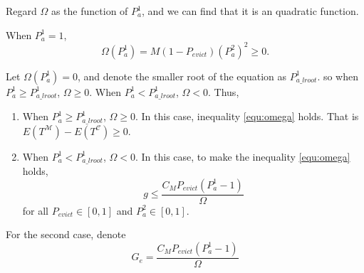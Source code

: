 Regard $\Omega$ as the function of $P_{a}^{\mathfrak{1}}$,
and we can find that it is an quadratic function.

When $P_{a}^{\mathfrak{1}} = 1$,
$$\Omega(P_{a}^{\mathfrak{1}})=M(1-P_{evict})(P_{a}^{\mathfrak{2}})^2 \geq 0 .$$

Let $\Omega(P_{a}^{\mathfrak{1}}) = 0$,
 and denote the smaller root of the equation as $P_{a\_lroot}^{\mathfrak{1}}$.
  so when $P_{a}^{\mathfrak{1}} \geq P_{a\_lroot}^{\mathfrak{1}}$, $\Omega \geq 0$.
   When $P_{a}^{\mathfrak{1}} < P_{a\_lroot}^{\mathfrak{1}}$, $\Omega < 0$.
 Thus,
\begin{enumerate}
  \item
  When $P_{a}^{\mathfrak{1}} \geq P_{a\_lroot}^{\mathfrak{1}}$, $\Omega \geq 0$.
  In this case, inequality \ref{equ:omega} holds. That is $E(T^{\mathcal{M}}) - E(T^{\mathcal{C}}) \geq 0$.
  \item
  When $P_{a}^{\mathfrak{1}} < P_{a\_lroot}^{\mathfrak{1}}$, $\Omega < 0$.
   In this case, to make the inequality \ref{equ:omega} holds,
   \begin{equation}\label{equ:ge}
     g \leq \frac{C_{M}P_{evict}(P_{a}^{\mathfrak{1}}-1)}{\Omega}
   \end{equation}
    for all $P_{evict} \in [0,1]$ and $P_{a}^{\mathfrak{2}} \in [0,1]$.
\end{enumerate}

For the second case, denote
    $$G_e = \frac{C_{M}P_{evict}(P_{a}^{\mathfrak{1}}-1)}{\Omega}$$



